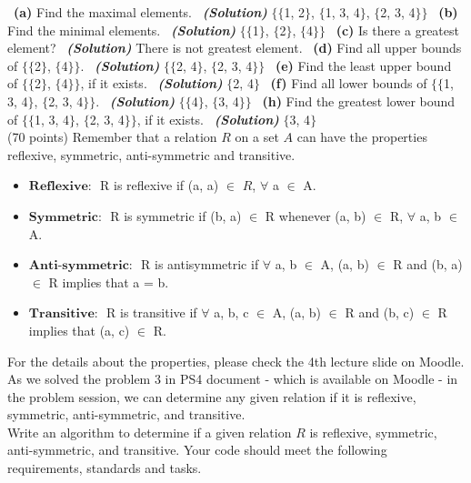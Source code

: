 \documentclass[a4 paper]{article}
\numberwithin{equation}{section}
\newcommand{\problem}[2]{~\\\fbox{\textbf{Problem #1}}\hfill (#2 points)\newline\newline}
\newcommand{\subproblem}[1]{~\newline\textbf{(#1)}}
\newcommand{\solution}{~\newline\textbf{\textit{(Solution)}} }
\newcommand{\0}{\mathbf{0}}
\begin{document}
\subproblem{a} Find the maximal elements.
\solution $\{$$\{$1, 2$\}$, $\{$1, 3, 4$\}$, $\{$2, 3, 4$\}$$\}$
\subproblem{b} Find the minimal elements.
\solution $\{$$\{$1$\}$, $\{$2$\}$, $\{$4$\}$$\}$
\subproblem{c} Is there a greatest element?
\solution There is not greatest element. 
\subproblem{d} Find all upper bounds of $\{\{$2$\}$, $\{$4$\}\}$.
\solution $\{$$\{$2, 4$\}$, $\{$2, 3, 4$\}$$\}$
\subproblem{e} Find the least upper bound of $\{\{$2$\}$, $\{$4$\}\}$, if it exists.
\solution $\{$2, 4$\}$
\subproblem{f} Find all lower bounds of $\{\{$1, 3, 4$\}$, $\{$2, 3, 4$\}\}$.
\solution $\{$$\{$4$\}$, $\{$3, 4$\}$$\}$
\subproblem{h} Find the greatest lower bound of $\{\{$1, 3, 4$\}$, $\{$2, 3, 4$\}\}$,
if it exists.
\solution $\{$3, 4$\}$
\newpage
\problem{3: Relations}{70}
Remember that a relation $R$ on a set $A$ can have the properties reflexive, symmetric, anti-symmetric and transitive.

\begin{itemize}
	\item $\textbf{Reflexive: }$ R is reflexive if (a, a) $\in$ $R$, $\forall$ a $\in$ A.
	\item $\textbf{Symmetric: }$ R is symmetric if (b, a) $\in$ R whenever (a, b) $\in$ R, $\forall$ a, b $\in$ A.
	\item $\textbf{Anti-symmetric: }$ R is antisymmetric if $\forall$ a, b $\in$ A, (a, b) $\in$ R and (b, a) $\in$ R implies that a = b.
	\item $\textbf{Transitive: }$ R is transitive if $\forall$ a, b, c $\in$ A, (a, b) $\in$ R and (b, c) $\in$ R implies that (a, c) $\in$ R.
\end{itemize}
For the details about the properties, please check the 4th lecture slide on Moodle. \\

As we solved the problem 3 in PS4 document - which is available on Moodle - in the problem session, we can determine any given relation if it is reflexive, symmetric, anti-symmetric, and transitive.\\

Write an algorithm to determine if a given relation $R$ is reflexive, symmetric, anti-symmetric, and transitive. Your code should meet the following requirements, standards and tasks.
\end{document}
